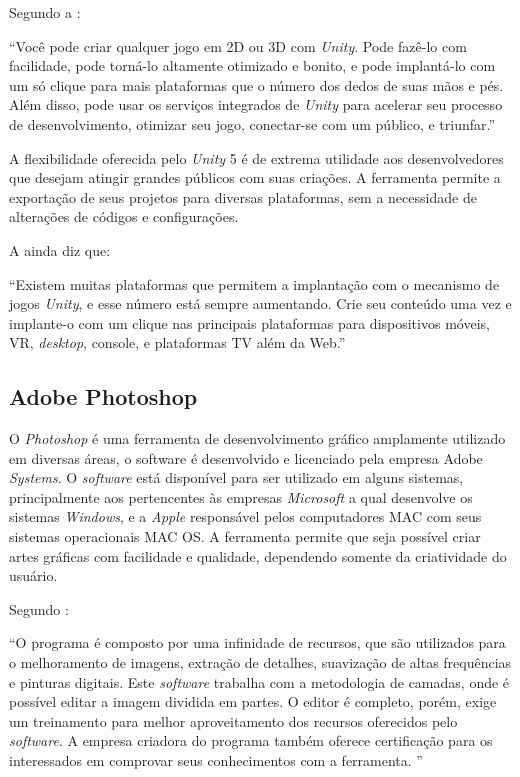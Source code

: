 \documentclass[
	12pt,				%
    oneside,			%
	a4paper,			%
	english,			%
	french,				%
	spanish,			%
	brazil,				%
	]{abntex2}
\begin{document}
			Segundo a :
			\begin{citacao}
				“Você pode criar qualquer jogo em 2D ou 3D com \textit{Unity}. Pode fazê-lo com facilidade, pode torná-lo altamente otimizado e bonito, e pode implantá-lo com um só clique para mais plataformas que o número dos dedos de suas mãos e pés. Além disso, pode usar os serviços integrados de \textit{Unity} para acelerar seu processo de desenvolvimento, otimizar seu jogo, conectar-se com um público, e triunfar.”
			\end{citacao}
			
				A flexibilidade oferecida pelo \textit{Unity} 5 é de extrema utilidade aos desenvolvedores que desejam atingir grandes públicos com suas criações. A ferramenta permite a exportação de seus projetos para diversas plataformas, sem a necessidade de alterações de códigos e configurações.
				
			A  ainda diz que:
			\begin{citacao}
				“Existem muitas plataformas que permitem a implantação com o mecanismo de jogos \textit{Unity}, e esse número está sempre aumentando. Crie seu conteúdo uma vez e implante-o com um clique nas principais plataformas para dispositivos móveis, VR, \textit{desktop}, console, e plataformas TV além da Web.”
			\end{citacao}
		
	\subsection{Adobe Photoshop}
	
		O \textit{Photoshop} é uma ferramenta de desenvolvimento gráfico amplamente utilizado em diversas áreas, o software é desenvolvido e licenciado pela empresa Adobe \textit{Systems}. O \textit{software} está disponível para ser utilizado em alguns sistemas, principalmente aos pertencentes às empresas \textit{Microsoft} a qual desenvolve os sistemas \textit{Windows}, e a \textit{Apple} responsável pelos computadores MAC com seus sistemas operacionais MAC OS. A ferramenta permite que seja possível criar artes gráficas com facilidade e qualidade, dependendo somente da criatividade do usuário.
		
		Segundo :
		\begin{citacao}
			“O programa é composto por uma infinidade de recursos, que são utilizados para o melhoramento de imagens, extração de detalhes, suavização de altas frequências e pinturas digitais. Este \textit{software} trabalha com a metodologia de camadas, onde é possível editar a imagem dividida em partes.	O editor é completo, porém, exige um treinamento para melhor aproveitamento dos recursos oferecidos pelo \textit{software}. A empresa criadora do programa também oferece certificação para os interessados em comprovar seus conhecimentos com a ferramenta. ”
		\end{citacao}		
			
\end{document}
